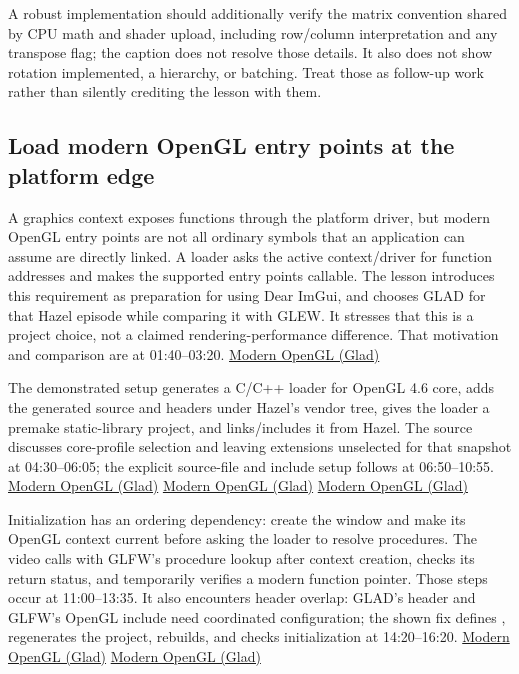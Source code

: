 A robust implementation should additionally verify the matrix convention shared by CPU math and shader upload, including row/column interpretation and any transpose flag; the caption does not resolve those details. It also does not show rotation implemented, a hierarchy, or batching. Treat those as follow-up work rather than silently crediting the lesson with them.

\subsection{Load modern OpenGL entry points at the platform edge}\label{06-engine-ii-ch025-load-modern-opengl-entry-points-at-the-platform-edge}

\hypertarget{06-engine-ii-ch025-load-modern-opengl-entry-points-at-the-platform-edge}{}

A graphics context exposes functions through the platform driver, but modern OpenGL entry points are not all ordinary symbols that an application can assume are directly linked. A loader asks the active context/driver for function addresses and makes the supported entry points callable. The lesson introduces this requirement as preparation for using Dear ImGui, and chooses GLAD for that Hazel episode while comparing it with GLEW. It stresses that this is a project choice, not a claimed rendering-performance difference. That motivation and comparison are at 01:40--03:20. \href{https://www.youtube.com/watch?v=HFyHIc89z1g&t=100s}{Modern OpenGL (Glad)}

The demonstrated setup generates a C/C++ loader for OpenGL 4.6 core, adds the generated source and headers under Hazel's vendor tree, gives the loader a premake static-library project, and links/includes it from Hazel. The source discusses core-profile selection and leaving extensions unselected for that snapshot at 04:30--06:05; the explicit source-file and include setup follows at 06:50--10:55. \href{https://www.youtube.com/watch?v=HFyHIc89z1g&t=270s}{Modern OpenGL (Glad)} \href{https://www.youtube.com/watch?v=HFyHIc89z1g&t=410s}{Modern OpenGL (Glad)} \href{https://www.youtube.com/watch?v=HFyHIc89z1g&t=650s}{Modern OpenGL (Glad)}

Initialization has an ordering dependency: create the window and make its OpenGL context current before asking the loader to resolve procedures. The video calls  with GLFW's procedure lookup after context creation, checks its return status, and temporarily verifies a modern function pointer. Those steps occur at 11:00--13:35. It also encounters header overlap: GLAD's header and GLFW's OpenGL include need coordinated configuration; the shown fix defines , regenerates the project, rebuilds, and checks initialization at 14:20--16:20. \href{https://www.youtube.com/watch?v=HFyHIc89z1g&t=660s}{Modern OpenGL (Glad)} \href{https://www.youtube.com/watch?v=HFyHIc89z1g&t=860s}{Modern OpenGL (Glad)}

